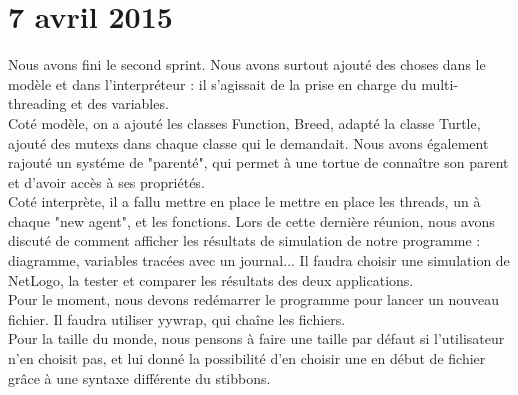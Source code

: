 \section{7 avril 2015}
Nous avons fini le second sprint. Nous avons surtout ajouté des choses dans le modèle et dans l'interpréteur : 
il s'agissait de la prise en charge du multi-threading et des variables.\\
Coté modèle, on a ajouté les classes Function, Breed, adapté la classe Turtle, ajouté des mutexs dans chaque classe qui le demandait.
Nous avons également rajouté un systéme de "parenté", qui permet à une tortue de connaître son parent et d'avoir accès à ses propriétés.\\
Coté interprète, il a fallu mettre en place le mettre en place les threads, un à chaque "new agent", et les fonctions.
Lors de cette dernière réunion, nous avons discuté de comment afficher les résultats de simulation de notre programme : diagramme, variables tracées avec un journal... Il faudra choisir une simulation de NetLogo, la tester et comparer les résultats des deux applications.\\
Pour le moment, nous devons redémarrer le programme pour lancer un nouveau fichier. Il faudra utiliser yywrap, qui chaîne les fichiers.\\
Pour la taille du monde, nous pensons à faire une taille par défaut si l'utilisateur n'en choisit pas, et lui donné la possibilité d'en choisir une en début de fichier grâce à une syntaxe différente du stibbons.
